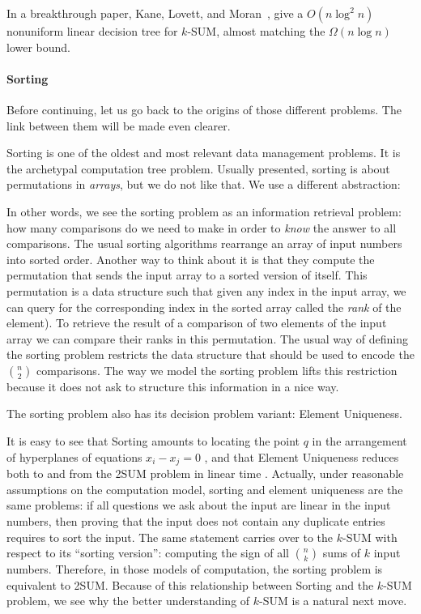 In a breakthrough paper, Kane, Lovett, and Moran~\cite{KLM18}, give a
\(O(n \log^2 n)\) nonuniform linear decision tree for \(k\)-SUM, almost
matching the \(\Omega(n \log n)\) lower bound.


\paragraph{Sorting}
Before continuing, let us go back to the origins of those different problems.
The link between them will be made even clearer.

Sorting is one of the oldest and most relevant data management problems.
It is the archetypal computation tree problem.
%
Usually presented, sorting is about permutations in \emph{arrays}, but we do
not like that. We use a different abstraction:
%


In other words, we see the sorting problem as an information retrieval problem:
how many comparisons do we need to make in order to \emph{know} the answer to
all comparisons.
%
The usual sorting algorithms rearrange an array of input numbers into sorted
order. Another way to think about it is that they compute the permutation that
sends the input array to a sorted version of itself. This permutation is a data
structure such that given any index in the input array, we can query for the
corresponding index in the sorted array called the \emph{rank} of the element).
To retrieve the result of a comparison of two elements of the input array we can
compare their ranks in this permutation.
The usual way of defining the sorting problem restricts the data structure that
should be used to encode the \(n \choose 2\) comparisons.
The way we model the sorting problem lifts this restriction because it does not
ask to structure this information in a nice way.

The sorting problem also has its decision problem variant: Element Uniqueness.
%


It is easy to see
that Sorting amounts to locating the point \(q\) in
the arrangement of hyperplanes of equations \(x_i - x_j = 0\)%
, and
that Element Uniqueness reduces both to and from the 2SUM
problem in linear time%
.
%
Actually, under reasonable assumptions on the computation model, sorting and
element uniqueness are the same problems: if all questions we ask about the
input are linear in the input numbers, then proving that the input
does not contain any duplicate entries requires to sort the input.
%
The same statement carries over to the \(k\)-SUM with respect to its ``sorting
version'': computing the sign of all \(n \choose k\) sums of \(k\) input
numbers.
%
Therefore, in those models of computation, the sorting problem is equivalent to
2SUM.
%
Because of this relationship between Sorting and the \(k\)-SUM problem,
we see why the better understanding of \(k\)-SUM is a natural next move.

